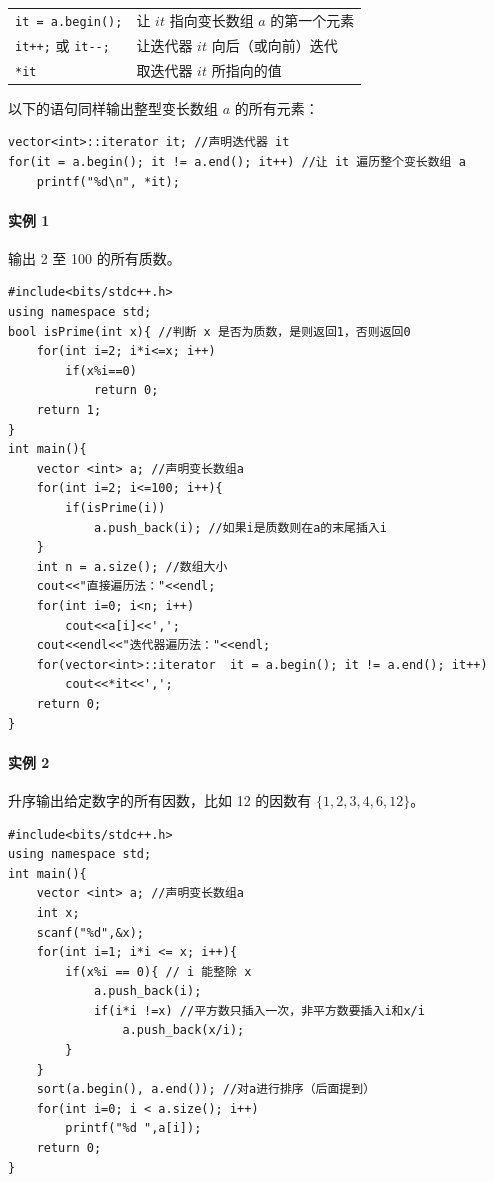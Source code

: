 \documentclass[UTF8]{ctexart}
\begin{document}
\begin{table}[H]
  \centering
  \begin{tabular}{ll}
    \verb!it = a.begin();!  & 让 $it$ 指向变长数组 $a$ 的第一个元素 \\
    \verb!it++;! 或 \verb!it--;!  & 让迭代器 $it$ 向后（或向前）迭代 \\
    \verb!*it! & 取迭代器 $it$ 所指向的值 \\
  \end{tabular}
\end{table}

以下的语句同样输出整型变长数组 $a$ 的所有元素：
\begin{lstlisting}[numbers=none]
vector<int>::iterator it; //声明迭代器 it
for(it = a.begin(); it != a.end(); it++) //让 it 遍历整个变长数组 a
    printf("%d\n", *it);
\end{lstlisting}

\paragraph{实例 1} 输出 2 至 100 的所有质数。
\begin{lstlisting}
#include<bits/stdc++.h>
using namespace std;
bool isPrime(int x){ //判断 x 是否为质数，是则返回1，否则返回0
	for(int i=2; i*i<=x; i++)
		if(x%i==0)
			return 0;
	return 1;
}
int main(){
	vector <int> a; //声明变长数组a
	for(int i=2; i<=100; i++){
		if(isPrime(i))
			a.push_back(i); //如果i是质数则在a的末尾插入i
	}
	int n = a.size(); //数组大小
	cout<<"直接遍历法："<<endl;
	for(int i=0; i<n; i++)
		cout<<a[i]<<',';
	cout<<endl<<"迭代器遍历法："<<endl;
	for(vector<int>::iterator  it = a.begin(); it != a.end(); it++)
		cout<<*it<<',';
    return 0;
}
\end{lstlisting}

\paragraph{实例 2} 升序输出给定数字的所有因数，比如 12 的因数有 $\{1,2,3,4,6,12\}$。

\begin{lstlisting}
#include<bits/stdc++.h>
using namespace std;
int main(){
	vector <int> a; //声明变长数组a
	int x;
	scanf("%d",&x);
	for(int i=1; i*i <= x; i++){
		if(x%i == 0){ // i 能整除 x
			a.push_back(i);
			if(i*i !=x) //平方数只插入一次，非平方数要插入i和x/i
				a.push_back(x/i);
		}
	}
	sort(a.begin(), a.end()); //对a进行排序（后面提到）
	for(int i=0; i < a.size(); i++)
		printf("%d ",a[i]);
	return 0;
}
\end{lstlisting}
\end{document}
